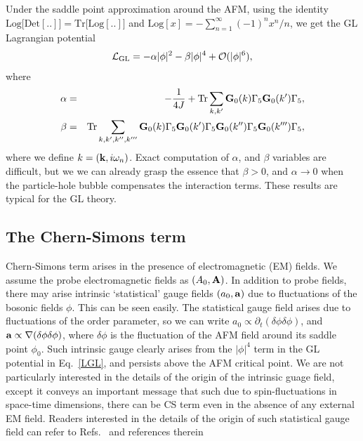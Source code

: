 \documentclass[aps,floatfix,prl]{revtex4}
\begin{document}
Under the saddle point approximation around the AFM, using the identity $\text{Log[Det}[..]]=\text{Tr[Log}[..]]$ and $\text{Log}[x]=-\sum_{n=1}^{\infty}(-1)^nx^n/n$, we get the GL Lagrangian potential
\begin{eqnarray}
\mathcal{L}_{\rm GL}= -\alpha|\phi|^2-\beta|\phi|^4+\mathcal{O}(|\phi|^6),
\label{LGL}
\end{eqnarray}
where 
\begin{eqnarray}
\alpha &=&-\frac{1}{4J}+{\rm Tr}\sum_{k,k'} {\bf G}_0(k)\Gamma_5 {\bf G}_0(k')\Gamma_5,\\
\beta &=& {\rm Tr}\sum_{k,k',k'',k'''}{\bf G}_0(k)\Gamma_5 {\bf G}_0(k')\Gamma_5 {\bf G}_0(k'')\Gamma_5 {\bf G}_0(k''')\Gamma_5,
\end{eqnarray}
where we define $k=({\bf k},i\omega_n)$. Exact computation of $\alpha$, and $\beta$ variables are difficult, but we we can already grasp the essence that $\beta>0$, and $\alpha\rightarrow 0$ when the particle-hole bubble compensates the interaction terms. These results are typical for the GL theory.

\subsection{The Chern-Simons term}
Chern-Simons term arises in the presence of electromagnetic (EM) fields. We assume the probe electromagnetic fields as $(A_0, {\bf A})$. In addition to probe fields, there may arise intrinsic `statistical' gauge fields $(a_0, {\bf a})$ due to fluctuations of the bosonic fields $\phi$. This can be seen easily. The statistical gauge field arises due to fluctuations of the order parameter, so we can write $a_0\propto \partial_t (\delta \phi\delta \phi)$, and ${\bf a}\propto \nabla (\delta \phi\delta \phi)$, where $\delta \phi$ is the fluctuation of the AFM field around its saddle point $\phi_0$. Such intrinsic gauge clearly arises from the $|\phi|^4$ term in the GL potential in Eq.~\eqref{LGL}, and persists above the AFM critical point. We are not particularly interested in the details of the origin of the intrinsic guage field, except it conveys an important message that such due to spin-fluctuations in space-time dimensions, there can be CS term even in the absence of any external EM field. Readers interested in the details of the origin of such statistical gauge field can refer to Refs.~\cite{CSGL_Zhang,axionJPSJ} and references therein
\end{document}
